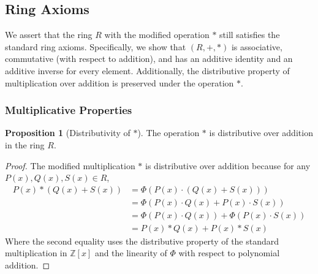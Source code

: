 \documentclass{article}
\theoremstyle{plain}
\theoremstyle{definition}
\newtheorem{proposition}{Proposition}
\begin{document}
\subsection{Ring Axioms}
We assert that the ring \( R \) with the modified operation \(\ast\) still satisfies the standard ring axioms. Specifically, we show that \((R, +, \ast)\) is associative, commutative (with respect to addition), and has an additive identity and an additive inverse for every element. Additionally, the distributive property of multiplication over addition is preserved under the operation \(\ast\).

\subsubsection{Multiplicative Properties}
\begin{proposition}[Distributivity of \(\ast\)] \label{proposition:ring:1}
The operation \(\ast\) is distributive over addition in the ring \(R\).
\end{proposition}
\begin{proof}
The modified multiplication \(\ast\) is distributive over addition because for any \( P(x), Q(x), S(x) \in R \),
\begin{align}
    P(x) \ast (Q(x) + S(x)) &= \Phi(P(x) \cdot (Q(x) + S(x))) \\
    &= \Phi(P(x) \cdot Q(x) + P(x) \cdot S(x)) \\
    &= \Phi(P(x) \cdot Q(x)) + \Phi(P(x) \cdot S(x)) \\
    &= P(x) \ast Q(x) + P(x) \ast S(x)
\end{align}
Where the second equality uses the distributive property of the standard multiplication in \( \mathbb{Z}[x] \) and the linearity of \(\Phi\) with respect to polynomial addition.
\end{proof}
\end{document}
